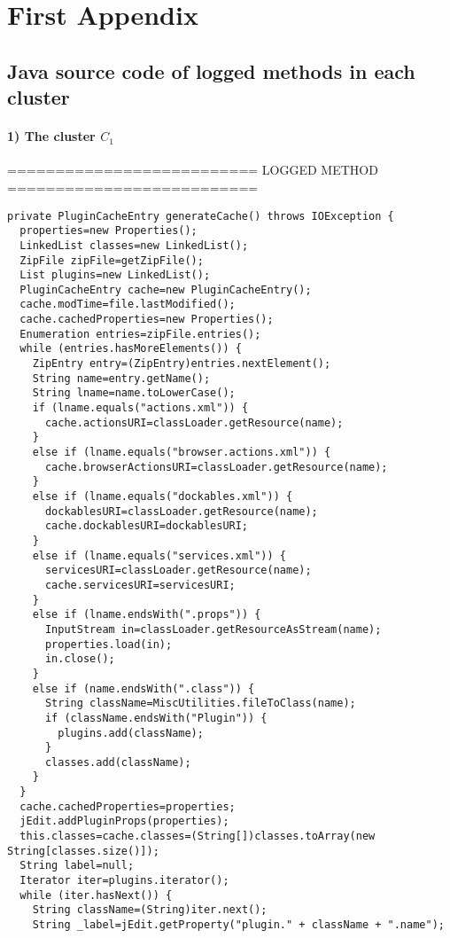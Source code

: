 
\chapter{First Appendix}
\section{Java source code of logged methods in each cluster}

\subsubsection {\textbf{1) The cluster $C_1$}}

========================== LOGGED METHOD ==========================
\begin{lstlisting}
private PluginCacheEntry generateCache() throws IOException {
  properties=new Properties();
  LinkedList classes=new LinkedList();
  ZipFile zipFile=getZipFile();
  List plugins=new LinkedList();
  PluginCacheEntry cache=new PluginCacheEntry();
  cache.modTime=file.lastModified();
  cache.cachedProperties=new Properties();
  Enumeration entries=zipFile.entries();
  while (entries.hasMoreElements()) {
    ZipEntry entry=(ZipEntry)entries.nextElement();
    String name=entry.getName();
    String lname=name.toLowerCase();
    if (lname.equals("actions.xml")) {
      cache.actionsURI=classLoader.getResource(name);
    }
    else if (lname.equals("browser.actions.xml")) {
      cache.browserActionsURI=classLoader.getResource(name);
    }
    else if (lname.equals("dockables.xml")) {
      dockablesURI=classLoader.getResource(name);
      cache.dockablesURI=dockablesURI;
    }
    else if (lname.equals("services.xml")) {
      servicesURI=classLoader.getResource(name);
      cache.servicesURI=servicesURI;
    }
    else if (lname.endsWith(".props")) {
      InputStream in=classLoader.getResourceAsStream(name);
      properties.load(in);
      in.close();
    }
    else if (name.endsWith(".class")) {
      String className=MiscUtilities.fileToClass(name);
      if (className.endsWith("Plugin")) {
        plugins.add(className);
      }
      classes.add(className);
    }
  }
  cache.cachedProperties=properties;
  jEdit.addPluginProps(properties);
  this.classes=cache.classes=(String[])classes.toArray(new String[classes.size()]);
  String label=null;
  Iterator iter=plugins.iterator();
  while (iter.hasNext()) {
    String className=(String)iter.next();
    String _label=jEdit.getProperty("plugin." + className + ".name");

\end{lstlisting}
